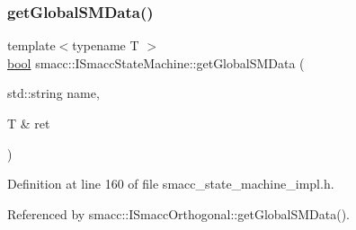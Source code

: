 \subsubsection{\texorpdfstring{get\+Global\+S\+M\+Data()}{getGlobalSMData()}}
{\footnotesize\ttfamily template$<$typename T $>$ \\
\hyperlink{classbool}{bool} smacc\+::\+I\+Smacc\+State\+Machine\+::get\+Global\+S\+M\+Data (\begin{DoxyParamCaption}\item[{std\+::string}]{name,  }\item[{T \&}]{ret }\end{DoxyParamCaption})}



Definition at line 160 of file smacc\+\_\+state\+\_\+machine\+\_\+impl.\+h.



Referenced by smacc\+::\+I\+Smacc\+Orthogonal\+::get\+Global\+S\+M\+Data().


